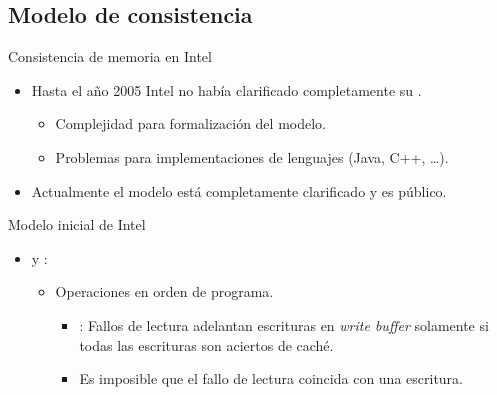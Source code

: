\subsection{Modelo de consistencia}

\begin{frame}[t]{Consistencia de memoria en Intel}
\begin{itemize}
  \item Hasta el año 2005 Intel no había clarificado completamente su 
        .
    \begin{itemize}
      \item Complejidad para formalización del modelo.
      \item Problemas para implementaciones de lenguajes (Java, C++, \ldots).
    \end{itemize}

  \item Actualmente el modelo está completamente clarificado y es público.
\end{itemize}
\end{frame}

\begin{frame}[t]{Modelo inicial de Intel}
\begin{itemize}
  \item {} y :
    \begin{itemize}
      \item Operaciones en orden de programa.
        \begin{itemize}
          \item {}: Fallos de lectura adelantan escrituras en 
                \emph{write buffer} solamente si todas las escrituras son aciertos de caché.
          \item Es imposible que el fallo de lectura coincida con una escritura.
        \end{itemize}
    \end{itemize}
\end{itemize}
\end{frame}

